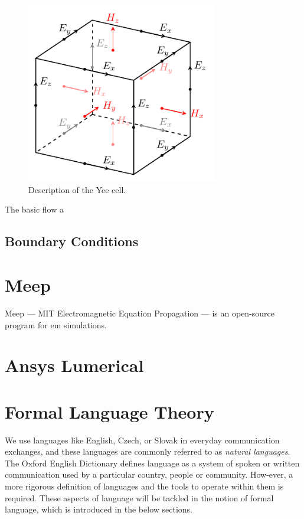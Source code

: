 \begin{figure}[H]
  \label{fig:yee}
  \centering
  \includegraphics[width=0.75\textwidth]{figures/yee.pdf}
  \caption{Description of the Yee cell.}
\end{figure}

The basic flow a


\subsection{Boundary Conditions}

\section{Meep}
Meep --- MIT Electromagnetic Equation Propagation --- is an open-source program for \gls{em} simulations. 
\section{Ansys Lumerical}
\section{Formal Language Theory}
We use languages like English, Czech, or Slovak in everyday communication exchanges, and these languages are commonly referred to as \emph{natural languages}. The Oxford English Dictionary defines language as a system of spoken or written communication used by a particular country, people or community. How-ever, a more rigorous definition of languages and the tools to operate within them is required. These aspects of language will be tackled in the notion of formal language, which is introduced in the below sections.

